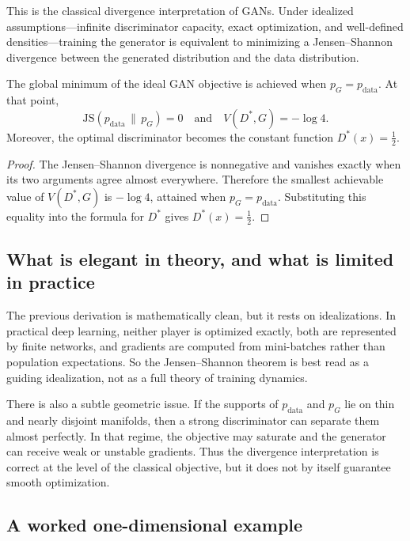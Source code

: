 This is the classical divergence interpretation of GANs.
Under idealized assumptions---infinite discriminator capacity, exact optimization, and well-defined densities---training the generator is equivalent to minimizing a Jensen--Shannon divergence between the generated distribution and the data distribution.

\begin{corollary}
The global minimum of the ideal GAN objective is achieved when $p_G=p_{\mathrm{data}}$.
At that point,
\[
\mathrm{JS}(p_{\mathrm{data}}\,\|\,p_G)=0
\quad \text{and} \quad
V(D^*,G)=-\log 4.
\]
Moreover, the optimal discriminator becomes the constant function $D^*(x)=\tfrac12$.
\end{corollary}

\begin{proof}
The Jensen--Shannon divergence is nonnegative and vanishes exactly when its two arguments agree almost everywhere.
Therefore the smallest achievable value of $V(D^*,G)$ is $-\log 4$, attained when $p_G=p_{\mathrm{data}}$.
Substituting this equality into the formula for $D^*$ gives $D^*(x)=\tfrac12$.
\end{proof}

\subsection*{What is elegant in theory, and what is limited in practice}

The previous derivation is mathematically clean, but it rests on idealizations.
In practical deep learning, neither player is optimized exactly, both are represented by finite networks, and gradients are computed from mini-batches rather than population expectations.
So the Jensen--Shannon theorem is best read as a guiding idealization, not as a full theory of training dynamics.

There is also a subtle geometric issue.
If the supports of $p_{\mathrm{data}}$ and $p_G$ lie on thin and nearly disjoint manifolds, then a strong discriminator can separate them almost perfectly.
In that regime, the objective may saturate and the generator can receive weak or unstable gradients.
Thus the divergence interpretation is correct at the level of the classical objective, but it does not by itself guarantee smooth optimization.

\subsection*{A worked one-dimensional example}

